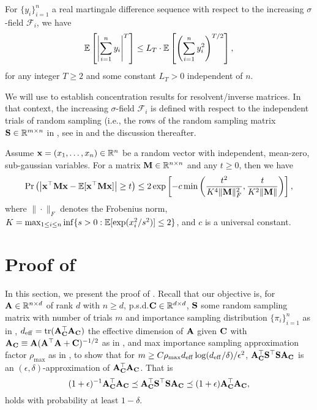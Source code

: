 \documentclass[11pt,a4paper]{article}
\begin{document}
\begin{lemma}\label{lem:Burkholder}
For $\{y_i\}^n_{i=1}$ a real martingale difference sequence with respect to the increasing $\sigma$-field $\mathcal F_i$, we have
\begin{equation*}
  \EE\left[\left|\sum_{i=1}^n y_i \right|^T \right]\leq L_T \cdot \EE\left[ \left(\sum_{i=1}^n y_i^2 \right)^{T/2} \right],
\end{equation*}
for any integer $T \geq 2$ and some constant $L_T > 0$ independent of $n$.
\end{lemma}
We will use  to establish concentration results for resolvent/inverse matrices. 
In that context, the increasing $\sigma$-field $\mathcal F_i$ is defined with respect to the independent trials of random sampling (i.e., the rows of the random sampling matrix $\S \in \RR^{m \times n}$ in , see  in  and the discussion thereafter.

\begin{theorem}\label{theo: hanson_wright_inequality}
Assume $\x = (x_1, \ldots, x_n) \in \RR^n$ be a random vector with independent, mean-zero, sub-gaussian  variables. 
For a matrix $\M\in\RR^{n\times n}$ and any  $t \geq 0$, then we have
\begin{align*}
    \Pr \left(\left| \x^\top \M \x - \EE[\x^\top \M \x] \right| \geq t \right ) \leq 2 \exp \left[ -c \min\left( \frac{t^2}{K^4 \|\M\|_F^2}, \frac{t}{K^2 \|\M\|} \right) \right],
\end{align*}
where $\|\cdot\|_F$ denotes the Frobenius norm, $K = \max_{1\leq i\leq n} \inf \{s > 0 : \EE[\exp(x_i^2 / s ^2) ]\leq 2\}$, and $c$  is a universal constant. 
\end{theorem}

 




\section{Proof of }
\label{sec:proof_sub_embedd}

In this section, we present the proof of .
Recall that our objective is, for $\A\in \RR^{n\times d}$ of rank $d$ with $n\geq d$, p.s.d.\@ $\C\in\RR^{d\times d}$, $\S$ some random sampling matrix with number of trials $m$ and importance sampling distribution $\{ \pi_i \}_{i=1}^n$ as in , $d_{\eff}=\tr( \A_\C^\top \A_\C )$ the effective dimension of $\A$ given $\C$ with $\A_\C \equiv \A(\A^\top \A+\C)^{-1/2}$ as in , and max importance sampling approximation  factor $\rho_{\max}$ as in , to show that for $m\geq C\rho_{\max} d_{\eff} \log(d_{\eff}/\delta )/\epsilon^2$, $ \A_\C^\top\S^\top\S\A_\C$ is an $(\epsilon,\delta)$-approximation of $\A_\C^\top\A_\C$.
That is
\begin{equation}
  (1+\epsilon)^{-1} \A_\C^\top \A_\C \preceq \A_\C^\top\S^\top\S\A_\C \preceq(1+\epsilon) \A_\C^\top \A_\C,
\end{equation}
holds with probability at least $1 - \delta$.
\end{document}
